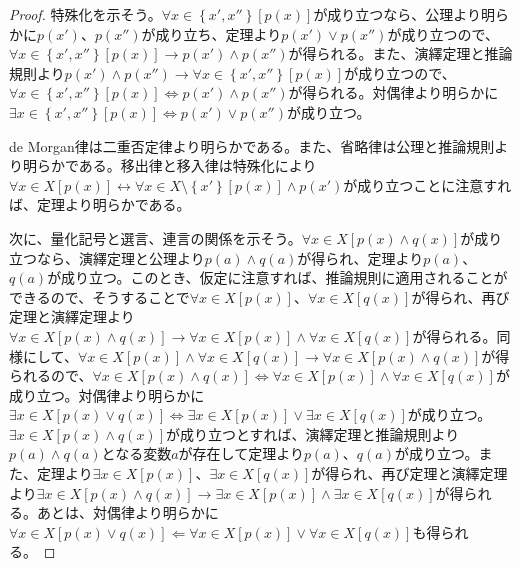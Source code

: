 \documentclass[a4paper]{jsarticle}
\begin{document}
\begin{proof}
特殊化を示そう。$\forall x \in \left\{ x',x'' \right\}\left[ p(x) \right]$が成り立つなら、公理より明らかに$p\left( x' \right)$、$p\left( x'' \right)$が成り立ち、定理より$p\left( x' \right) \vee p\left( x'' \right)$が成り立つので、$\forall x \in \left\{ x',x'' \right\}\left[ p(x) \right] \rightarrow p\left( x' \right) \land p\left( x'' \right)$が得られる。また、演繹定理と推論規則より$p\left( x' \right) \land p\left( x'' \right) \rightarrow \forall x \in \left\{ x',x'' \right\}\left[ p(x) \right]$が成り立つので、$\forall x \in \left\{ x',x'' \right\}\left[ p(x) \right] \Leftrightarrow p\left( x' \right) \land p\left( x'' \right)$が得られる。対偶律より明らかに$\exists x \in \left\{ x',x'' \right\}\left[ p(x) \right] \Leftrightarrow p\left( x' \right) \vee p\left( x'' \right)$が成り立つ。\par
de Morgan律は二重否定律より明らかである。また、省略律は公理と推論規則より明らかである。移出律と移入律は特殊化により$\forall x \in X\left[ p(x) \right] \leftrightarrow \forall x \in X \setminus \left\{ x' \right\}\left[ p(x) \right] \land p\left( x' \right)$が成り立つことに注意すれば、定理より明らかである。\par
次に、量化記号と選言、連言の関係を示そう。$\forall x \in X\left[ p(x) \land q(x) \right]$が成り立つなら、演繹定理と公理より$p(a) \land q(a)$が得られ、定理より$p(a)$、$q(a)$が成り立つ。このとき、仮定に注意すれば、推論規則に適用されることができるので、そうすることで$\forall x \in X\left[ p(x) \right]$、$\forall x \in X\left[ q(x) \right]$が得られ、再び定理と演繹定理より$\forall x \in X\left[ p(x) \land q(x) \right] \rightarrow \forall x \in X\left[ p(x) \right] \land \forall x \in X\left[ q(x) \right]$が得られる。同様にして、$\forall x \in X\left[ p(x) \right] \land \forall x \in X\left[ q(x) \right] \rightarrow \forall x \in X\left[ p(x) \land q(x) \right]$が得られるので、$\forall x \in X\left[ p(x) \land q(x) \right] \Leftrightarrow \forall x \in X\left[ p(x) \right] \land \forall x \in X\left[ q(x) \right]$が成り立つ。対偶律より明らかに$\exists x \in X\left[ p(x) \vee q(x) \right] \Leftrightarrow \exists x \in X\left[ p(x) \right] \vee \exists x \in X\left[ q(x) \right]$が成り立つ。$\exists x \in X\left[ p(x) \land q(x) \right]$が成り立つとすれば、演繹定理と推論規則より$p(a) \land q(a)$となる変数$a$が存在して定理より$p(a)$、$q(a)$が成り立つ。また、定理より$\exists x \in X\left[ p(x) \right]$、$\exists x \in X\left[ q(x) \right]$が得られ、再び定理と演繹定理より$\exists x \in X\left[ p(x) \land q(x) \right] \rightarrow \exists x \in X\left[ p(x) \right] \land \exists x \in X\left[ q(x) \right]$が得られる。あとは、対偶律より明らかに$\forall x \in X\left[ p(x) \vee q(x) \right] \Leftarrow \forall x \in X\left[ p(x) \right] \vee \forall x \in X\left[ q(x) \right]$も得られる。\par

\end{proof}
\end{document}
